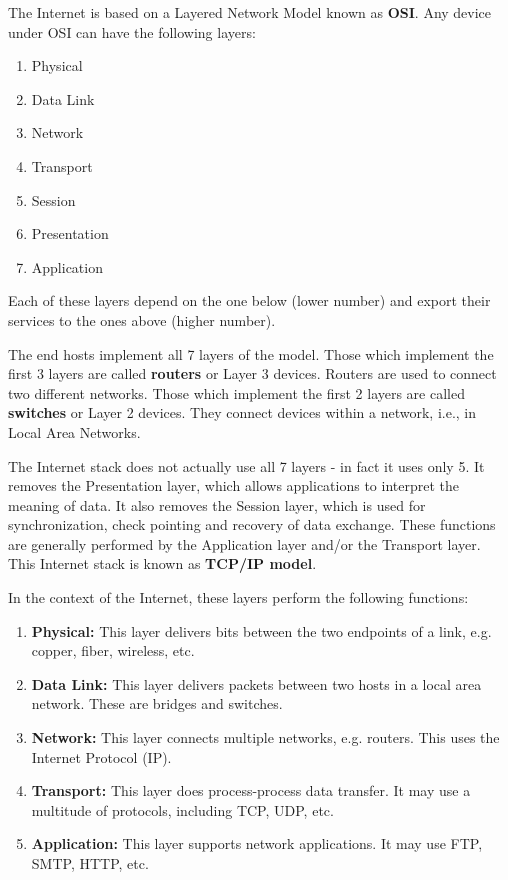 \documentclass[12pt,letterpaper]{article}
\theoremstyle{definition}
\begin{document}
The Internet is based on a Layered Network Model known as \textbf{OSI}. Any device under OSI can have the following layers:

\begin{enumerate}
  \item Physical
  \item Data Link
  \item Network
  \item Transport
  \item Session
  \item Presentation
  \item Application
\end{enumerate}

Each of these layers depend on the one below (lower number) and export their services to the ones above (higher number).

The end hosts implement all 7 layers of the model. Those which implement the first 3 layers are called \textbf{routers} or Layer 3 devices. Routers are used to connect two different networks. Those which implement the first 2 layers are called \textbf{switches} or Layer 2 devices. They connect devices within a network, i.e., in Local Area Networks.

The Internet stack does not actually use all 7 layers - in fact it uses only 5. It removes the Presentation layer, which allows applications to interpret the meaning of data. It also removes the Session layer, which is used for synchronization, check pointing and recovery of data exchange. These functions are generally performed by the Application layer and/or the Transport layer. This Internet stack is known as \textbf{TCP/IP model}.

In the context of the Internet, these layers perform the following functions:

\begin{enumerate}
  \item \textbf{Physical:} This layer delivers bits between the two endpoints of a link, e.g. copper, fiber, wireless, etc.
  \item \textbf{Data Link:} This layer delivers packets between two hosts in a local area network. These are bridges and switches.
  \item \textbf{Network:} This layer connects multiple networks, e.g. routers. This uses the Internet Protocol (IP).
  \item \textbf{Transport:} This layer does process-process data transfer. It may use a multitude of protocols, including TCP, UDP, etc.
  \item \textbf{Application:} This layer supports network applications. It may use FTP, SMTP, HTTP, etc.
\end{enumerate}
\end{document}

